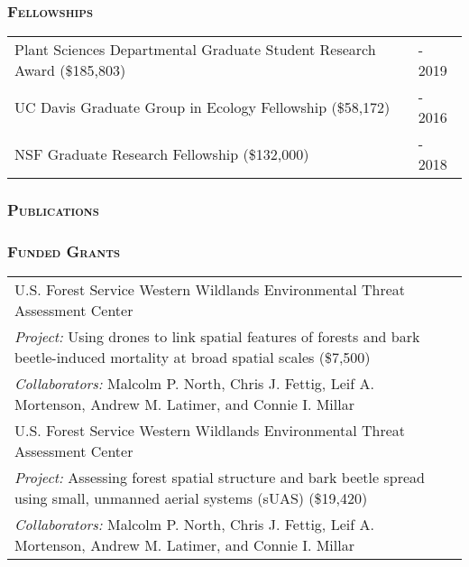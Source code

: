 \documentclass[10pt,english]{article}
\providecommand{\tabularnewline}{\\}
\begin{document}
\vspace{1ex}


\subsubsection*{\textsc{Fellowships}}
\vspace{-0.5ex}

\renewcommand{\arraystretch}{1.2}
\begin{tabularx}{\textwidth}{@{}>{\raggedright}p{5in} >{\raggedleft}X@{}}
Plant Sciences Departmental Graduate Student Research Award (\$185,803) & 2015 - 2019 \tabularnewline
UC Davis Graduate Group in Ecology Fellowship (\$58,172) & 2014 - 2016 \tabularnewline
NSF Graduate Research Fellowship (\$132,000) & 2013 - 2018 \tabularnewline
\end{tabularx}

\vspace{1ex}


\subsubsection*{\textsc{Publications}}

\setlength{\LTpre}{0pt}
\setlength{\LTpost}{2ex}
\setlength{\extrarowheight}{0.25ex}


\vspace{1ex}


\subsubsection*{\textsc{Funded Grants}}
\vspace{-0.5ex}

\renewcommand{\arraystretch}{1.2}
\begin{tabularx}{\textwidth}{@{}>{\raggedright}p{5.25in} >{\raggedleft}X@{}}
U.S. Forest Service Western Wildlands Environmental Threat Assessment Center & 2018 \tabularnewline
\addtolength{\leftskip}{5ex}\emph{Project:} Using drones to link spatial features of forests and bark beetle-induced mortality at broad spatial scales (\$7,500) & \tabularnewline
\addtolength{\leftskip}{5ex}\emph{Collaborators:} Malcolm P. North, Chris J. Fettig, Leif A. Mortenson, Andrew M. Latimer, and Connie I. Millar & \tabularnewline
U.S. Forest Service Western Wildlands Environmental Threat Assessment Center & 2017 \tabularnewline
\addtolength{\leftskip}{5ex}\emph{Project:} Assessing forest spatial structure and bark beetle spread using small, unmanned aerial systems (sUAS) (\$19,420) & \tabularnewline
\addtolength{\leftskip}{5ex}\emph{Collaborators:} Malcolm P. North, Chris J. Fettig, Leif A. Mortenson, Andrew M. Latimer, and Connie I. Millar & \tabularnewline
\end{tabularx}
\end{document}
